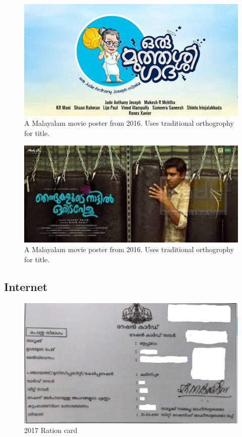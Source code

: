 \documentclass[10pt]{article}
\begin{document}
\begin{figure}
  \centering
   \includegraphics[width=1.0\textwidth]{images/2016-oru-muthashi-gadha}
  \caption{A Malayalam movie poster from 2016. Uses traditional orthogrophy for title.}
\end{figure}

\begin{figure}
  \centering
   \includegraphics[width=1.0\textwidth]{images/2017-movieposter-njandukalude}
  \caption{A Malayalam movie poster from 2016. Uses traditional orthogrophy for title.}
\end{figure}


\subsection{Internet}

\begin{figure}
  \centering
   \includegraphics[width=1.0\textwidth]{images/2017-rationcard.jpg}
     \caption{2017 Ration card}
\end{figure}
\end{document}
